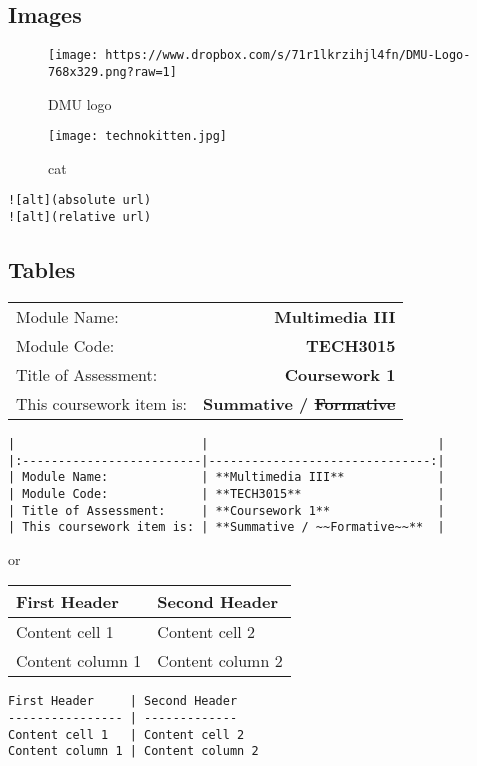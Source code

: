 \documentclass[
]{article}
\begin{document}
\hypertarget{images}{%
\subsection{Images}\label{images}}

\begin{figure}
\centering
\texttt{[image: https://www.dropbox.com/s/71r1lkrzihjl4fn/DMU-Logo-768x329.png?raw=1]}
\caption{DMU logo}
\end{figure}

\begin{figure}
\centering
\texttt{[image: technokitten.jpg]}
\caption{cat}
\end{figure}

\begin{verbatim}
![alt](absolute url)
![alt](relative url)
\end{verbatim}

\hypertarget{tables}{%
\subsection{Tables}\label{tables}}

\begin{longtable}[]{@{}lr@{}}
\toprule
\endhead
Module Name: & \textbf{Multimedia III}\tabularnewline
Module Code: & \textbf{TECH3015}\tabularnewline
Title of Assessment: & \textbf{Coursework 1}\tabularnewline
This coursework item is: & \textbf{Summative /
\sout{Formative}}\tabularnewline
\bottomrule
\end{longtable}

\begin{verbatim}
|                          |                                |
|:-------------------------|-------------------------------:|
| Module Name:             | **Multimedia III**             | 
| Module Code:             | **TECH3015**                   |
| Title of Assessment:     | **Coursework 1**               |
| This coursework item is: | **Summative / ~~Formative~~**  |
\end{verbatim}

or

\begin{longtable}[]{@{}ll@{}}
\toprule
First Header & Second Header\tabularnewline
\midrule
\endhead
Content cell 1 & Content cell 2\tabularnewline
Content column 1 & Content column 2\tabularnewline
\bottomrule
\end{longtable}

\begin{verbatim}
First Header     | Second Header
---------------- | -------------
Content cell 1   | Content cell 2
Content column 1 | Content column 2
\end{verbatim}
\end{document}
